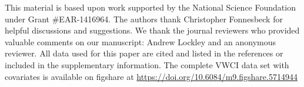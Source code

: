 \documentclass[draft,linenumbers]{agujournal}\usepackage{knitr}
\begin{document}
\acknowledgments
\sloppy
This material is based upon work supported by the National Science Foundation
under Grant \#EAR-1416964.
The authors thank Christopher Fonnesbeck for helpful discussions and suggestions.
We thank the journal reviewers who provided valuable comments on our manuscript:
Andrew Lockley and an anonymous reviewer.
All data used for this paper are cited and listed in the references or
included in the supplementary information.
The complete VWCI data set with
covariates is available on figshare at \url{https://doi.org/10.6084/m9.figshare.5714944}
%
%
\end{document}
